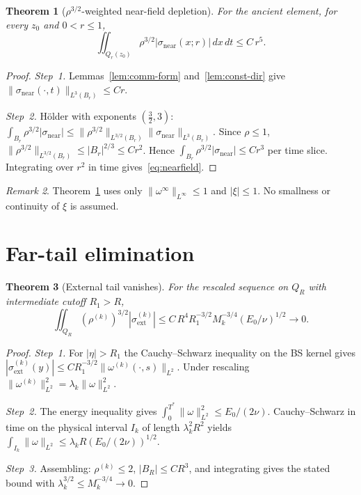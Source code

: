\documentclass[12pt, reqno]{amsart}
\newtheorem{theorem}{Theorem}[section]
\theoremstyle{definition}
\theoremstyle{remark}
\newtheorem{remark}[theorem]{Remark}
\numberwithin{equation}{section}
\newcommand{\step}[1]{\par\medskip\noindent\textit{Step~#1.}\enspace}
\begin{document}
\begin{theorem}[$\rho^{3/2}$-weighted near-field depletion]\label{thm:nearfield}
For the ancient element, for every $z_0$ and $0<r\le 1$,
\begin{equation}\label{eq:nearfield}
\iint_{Q_r(z_0)}\rho^{3/2}|\sigma_{\mathrm{near}}(x;r)|\,dx\,dt
\le C\,r^5.
\end{equation}
\end{theorem}
\begin{proof}
\step{1}
Lemmas~\ref{lem:comm-form} and~\ref{lem:const-dir} give
$\|\sigma_{\mathrm{near}}(\cdot,t)\|_{L^3(B_r)}\le Cr$.

\step{2}
H\"older with exponents $(\tfrac32,3)$:
$\int_{B_r}\rho^{3/2}|\sigma_{\mathrm{near}}|
\le\|\rho^{3/2}\|_{L^{3/2}(B_r)}\|\sigma_{\mathrm{near}}\|_{L^3(B_r)}$.
Since $\rho\le 1$, $\|\rho^{3/2}\|_{L^{3/2}(B_r)}\le|B_r|^{2/3}\le Cr^2$.
Hence $\int_{B_r}\rho^{3/2}|\sigma_{\mathrm{near}}|\le Cr^3$ per time
slice.  Integrating over $r^2$ in time gives~\eqref{eq:nearfield}.
\end{proof}

\begin{remark}\label{rem:unconditional}
Theorem~\ref{thm:nearfield} uses only $\|\omega^\infty\|_{L^\infty}\le 1$
and $|\xi|\le 1$.  No smallness or continuity of $\xi$ is assumed.
\end{remark}

\section{Far-tail elimination}\label{sec:tail}

\begin{theorem}[External tail vanishes]\label{thm:ext-tail}
For the rescaled sequence on $Q_R$ with intermediate cutoff $R_1>R$,
\[
\iint_{Q_R}(\rho^{(k)})^{3/2}|\sigma_{\mathrm{ext}}^{(k)}|
\le C\,R^4 R_1^{-3/2}M_k^{-3/4}(E_0/\nu)^{1/2}\to 0.
\]
\end{theorem}
\begin{proof}
\step{1}
For $|\eta|>R_1$ the Cauchy--Schwarz inequality on the BS kernel gives
$|\sigma_{\mathrm{ext}}^{(k)}(y)|\le CR_1^{-3/2}\|\omega^{(k)}(\cdot,s)\|_{L^2}$.
Under rescaling $\|\omega^{(k)}\|_{L^2}^2=\lambda_k\|\omega\|_{L^2}^2$.

\step{2}
The energy inequality gives
$\int_0^{T^*}\|\omega\|_{L^2}^2\le E_0/(2\nu)$.
Cauchy--Schwarz in time on the physical interval $I_k$ of length
$\lambda_k^2 R^2$ yields
$\int_{I_k}\|\omega\|_{L^2}\le\lambda_k R(E_0/(2\nu))^{1/2}$.

\step{3}
Assembling: $\rho^{(k)}\le 2$, $|B_R|\le CR^3$, and integrating
gives the stated bound with $\lambda_k^{3/2}\le M_k^{-3/4}\to 0$.
\end{proof}
\end{document}
